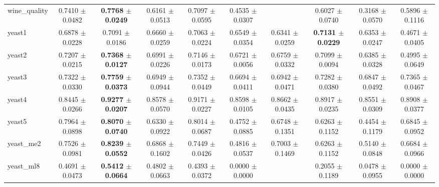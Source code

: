 \begin{table*}[htbp]
{\begin{tabular}{lccccccccc}
            wine\_quality & 0.7410 $\pm$ 0.0482 & \cellcolor{graybg}\textbf{0.7768 $\pm$ 0.0249} & 0.6161 $\pm$ 0.0513 & 0.7097 $\pm$ 0.0595 & 0.4535 $\pm$ 0.0307 &  & 0.6027 $\pm$ 0.0740 & 0.3168 $\pm$ 0.0570 & 0.5896 $\pm$ 0.1116 \\ 
            yeast1 & 0.6878 $\pm$ 0.0228 & 0.7091 $\pm$ 0.0186 & 0.6660 $\pm$ 0.0259 & 0.7063 $\pm$ 0.0224 & 0.6549 $\pm$ 0.0354 & 0.6341 $\pm$ 0.0259 & \cellcolor{graybg}\textbf{0.7131 $\pm$ 0.0229} & 0.6353 $\pm$ 0.0247 & 0.4671 $\pm$ 0.0405 \\ 
            yeast2 & 0.7207 $\pm$ 0.0215 & \cellcolor{graybg}\textbf{0.7368 $\pm$ 0.0127} & 0.6991 $\pm$ 0.0226 & 0.7146 $\pm$ 0.0173 & 0.6721 $\pm$ 0.0056 & 0.6759 $\pm$ 0.0332 & 0.7099 $\pm$ 0.0094 & 0.6385 $\pm$ 0.0328 & 0.4995 $\pm$ 0.0649 \\ 
            yeast3 & 0.7322 $\pm$ 0.0330 & \cellcolor{graybg}\textbf{0.7759 $\pm$ 0.0373} & 0.6949 $\pm$ 0.0944 & 0.7352 $\pm$ 0.0449 & 0.6694 $\pm$ 0.0411 & 0.6942 $\pm$ 0.0471 & 0.7282 $\pm$ 0.0380 & 0.6847 $\pm$ 0.0492 & 0.7365 $\pm$ 0.0467 \\ 
            yeast4 & 0.8445 $\pm$ 0.0266 & \cellcolor{graybg}\textbf{0.9277 $\pm$ 0.0207} & 0.8578 $\pm$ 0.0570 & 0.9171 $\pm$ 0.0227 & 0.8598 $\pm$ 0.0105 & 0.8662 $\pm$ 0.0435 & 0.8917 $\pm$ 0.0235 & 0.8551 $\pm$ 0.0309 & 0.8908 $\pm$ 0.0377 \\ 
            yeast5 & 0.7964 $\pm$ 0.0898 & \cellcolor{graybg}\textbf{0.8070 $\pm$ 0.0740} & 0.6330 $\pm$ 0.0922 & 0.8014 $\pm$ 0.0687 & 0.4752 $\pm$ 0.0885 & 0.6748 $\pm$ 0.1351 & 0.6263 $\pm$ 0.1152 & 0.4454 $\pm$ 0.1179 & 0.6845 $\pm$ 0.0952 \\ 
            yeast\_me2 & 0.7526 $\pm$ 0.0981 & \cellcolor{graybg}\textbf{0.8239 $\pm$ 0.0552} & 0.6868 $\pm$ 0.1602 & 0.7449 $\pm$ 0.0426 & 0.4816 $\pm$ 0.0537 & 0.7003 $\pm$ 0.1469 & 0.6263 $\pm$ 0.1152 & 0.5140 $\pm$ 0.0848 & 0.6684 $\pm$ 0.0966 \\ 
            yeast\_ml8 & 0.4691 $\pm$ 0.0473 & \cellcolor{graybg}\textbf{0.5412 $\pm$ 0.0664} & 0.4802 $\pm$ 0.0663 & 0.4393 $\pm$ 0.0372 & 0.0000 $\pm$ 0.0000 &  & 0.2055 $\pm$ 0.1189 & 0.0478 $\pm$ 0.0955 & 0.0000 $\pm$ 0.0000 \\ 
        \bottomrule
    \end{tabular}
    }
\end{table*}
